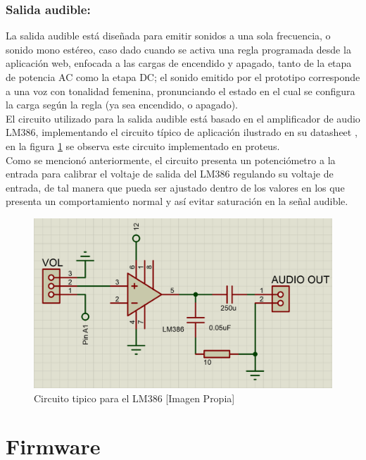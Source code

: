 	\subsubsection{Salida audible:}
		La salida audible está diseñada para emitir sonidos a una sola frecuencia, o sonido mono estéreo, caso dado cuando se activa una regla programada desde la aplicación web, enfocada a las cargas de encendido y apagado, tanto de la etapa de potencia AC como la etapa DC; el sonido emitido por el prototipo corresponde a una voz con tonalidad femenina, pronunciando el estado en el cual se configura la carga según la regla (ya sea encendido, o apagado).\\
		
		El circuito utilizado para la salida audible está basado en el amplificador de audio LM386, implementando el circuito típico de aplicación ilustrado en su datasheet  \cite{LM386}, en la figura \ref{fig:AUD} se observa este circuito implementado en proteus.\\
		
		Como se mencionó anteriormente, el circuito presenta un potenciómetro a la entrada para calibrar el voltaje de salida del LM386 regulando su voltaje de entrada, de tal manera que pueda ser ajustado dentro de los valores en los que presenta un comportamiento normal y así evitar saturación en la señal audible.\\
		
		\begin{figure}[H]
			\centering
			\caption{Circuito tipico para el LM386 [Imagen Propia]}
			\label{fig:AUD}
			\includegraphics[width=0.7\linewidth]{Imagenes/AUD}
		\end{figure}		
				
\section{Firmware}


